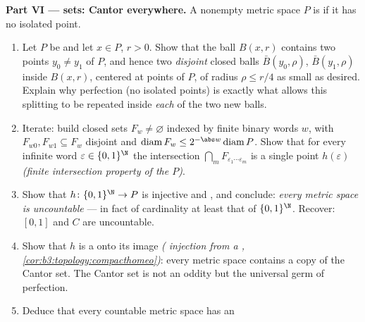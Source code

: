 \begin{problem}
\medskip
\noindent\textbf{Part VI ---   sets: Cantor
everywhere.} A nonempty  metric space $P$ is
\emph{} if it has no isolated point.
\begin{enumerate}[resume]
  \item Let $P$ be   and let $x \in P$, $r > 0$.
        Show that the ball $B(x, r)$ contains two points $y_0
        \neq y_1$ of $P$, and hence two \emph{disjoint} closed
        balls $\bar B(y_0, \rho)$, $\bar B(y_1, \rho)$ inside
        $B(x, r)$, centered at points of $P$, of radius $\rho
        \leq r/4$ as small as desired. Explain why perfection
        (no isolated points) is exactly what allows this
        splitting to be repeated inside \emph{each} of the two
        new balls.
  \item Iterate: build closed sets $F_w \neq \varnothing$
        indexed by finite binary words $w$, with $F_{w0},
        F_{w1} \subseteq F_w$ disjoint and
        $\operatorname{diam}F_w \leq 2^{-\abs w}
        \operatorname{diam}P$. Show that for every infinite
        word $\varepsilon \in \{0,1\}^\N$ the intersection
        $\bigcap_mF_{\varepsilon_1\cdots\varepsilon_m}$ is a
        single point $h(\varepsilon)$ \emph{(finite
        intersection property of the  $P$)}.
  \item Show that $h\colon\{0,1\}^\N \to P$ is injective and
        , and conclude: \emph{every  
        metric space is uncountable} --- in fact of cardinality
        at least that of $\{0,1\}^\N$. Recover: $[0,1]$ and $C$
        are uncountable.
  \item Show that $h$ is a  onto its image
        \emph{( injection from a ,
        \cref{cor:b3:topology:compacthomeo})}: every 
         metric space contains a  copy of
        the Cantor set. The Cantor set is not an oddity but the
        universal germ of  perfection.
  \item Deduce that every countable  metric space has an

\end{enumerate}
\end{problem}
